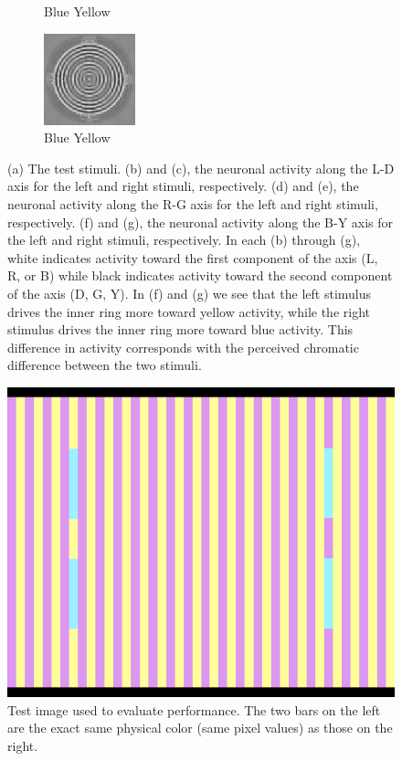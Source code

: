 \documentclass[journal,onecolumn]{IEEEtran}
\begin{document}
\begin{figure}[!htbp]
\begin{subfigure}[b]{0.25\textwidth}
            \caption{Blue Yellow}
            \label{img:test-circle-neon-dwt-b-by-mask}
    \end{subfigure}%
    \begin{subfigure}[b]{0.25\textwidth}
            \centering
            \includegraphics[width=100px, frame]{test-circle-neon-dwt-b-by}
            \caption{Blue Yellow}
            \label{img:test-circle-neon-dwt-b-by}
    \end{subfigure}
    \caption{(a) The test stimuli. (b) and (c), the neuronal activity along the L-D axis for the left and right stimuli, respectively. (d) and (e), the neuronal activity along the R-G axis for the left and right stimuli, respectively. (f) and (g), the neuronal activity along the B-Y axis for the left and right stimuli, respectively. In each (b) through (g), white indicates activity toward the first component of the axis (L, R, or B) while black indicates activity toward the second component of the axis (D, G, Y). In (f) and (g) we see that the left stimulus drives the inner ring more toward yellow activity, while the right stimulus drives the inner ring more toward blue activity. This difference in activity corresponds with the perceived chromatic difference between the two stimuli.}
\end{figure}

\begin{figure}[H] \label{img:test-bars}
    \centering
    \includegraphics[width=.5\textwidth]{test-bars}
    \caption{Test image used to evaluate performance. The two bars on the left are the exact same physical color (same pixel values) as those on the right.}
\end{figure}
\end{document}
